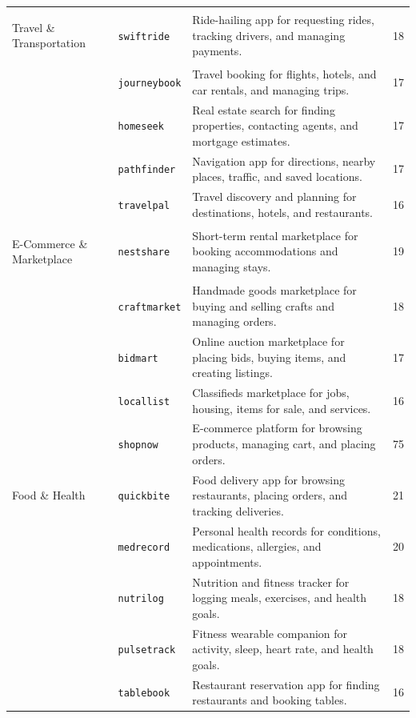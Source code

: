 \documentclass[11pt]{article}
\newcommand{\app}[1]{\texttt{#1}}
\begin{document}
{\begin{longtable}{@{}>{\bfseries\raggedright\arraybackslash}p{2.65cm} >{\raggedright\arraybackslash}p{2.55cm} >{\raggedright\arraybackslash}p{8.30cm} r@{}}
Travel \& Transportation
  & \app{swiftride}   & Ride-hailing app for requesting rides, tracking drivers, and managing payments.           & 18 \\
  & \app{journeybook} & Travel booking for flights, hotels, and car rentals, and managing trips.                 & 17 \\
  & \app{homeseek}    & Real estate search for finding properties, contacting agents, and mortgage estimates.     & 17 \\
  & \app{pathfinder}  & Navigation app for directions, nearby places, traffic, and saved locations.               & 17 \\
  & \app{travelpal}   & Travel discovery and planning for destinations, hotels, and restaurants.                  & 16 \\
\midrule

E-Commerce \& Marketplace
  & \app{nestshare}   & Short-term rental marketplace for booking accommodations and managing stays.              & 19 \\
  & \app{craftmarket} & Handmade goods marketplace for buying and selling crafts and managing orders.            & 18 \\
  & \app{bidmart}     & Online auction marketplace for placing bids, buying items, and creating listings.         & 17 \\
  & \app{locallist}   & Classifieds marketplace for jobs, housing, items for sale, and services.                  & 16 \\
  & \app{shopnow}     & E-commerce platform for browsing products, managing cart, and placing orders.             & 75 \\
\midrule

Food \& Health
  & \app{quickbite}  & Food delivery app for browsing restaurants, placing orders, and tracking deliveries.      & 21 \\
  & \app{medrecord}  & Personal health records for conditions, medications, allergies, and appointments.         & 20 \\
  & \app{nutrilog}   & Nutrition and fitness tracker for logging meals, exercises, and health goals.             & 18 \\
  & \app{pulsetrack} & Fitness wearable companion for activity, sleep, heart rate, and health goals.             & 18 \\
  & \app{tablebook}  & Restaurant reservation app for finding restaurants and booking tables.                    & 16 \\
\midrule


\end{longtable}}
\end{document}
